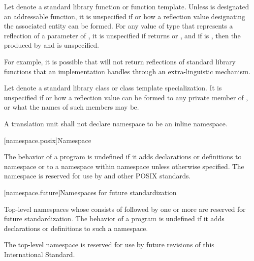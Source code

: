 \pnum
Let  denote
a standard library function or function template.
Unless  is designated an addressable function,
it is unspecified if or how
a reflection value designating the associated entity can be formed.
For any value  of type  that
represents a reflection of a parameter of ,
it is unspecified if 
returns  or , and
if  is , then
the \ntmbs{} produced by
 and
 is unspecified.
\begin{note}
For example, it is possible that 
will not return reflections of standard library functions
that an implementation handles through an extra-linguistic mechanism.
\end{note}

\pnum
Let  denote
a standard library class or class template specialization.
It is unspecified if or how
a reflection value can be formed to any private member of ,
or what the names of such members may be.

\pnum
A translation unit shall not declare namespace  to be an inline namespace.

[namespace.posix]{Namespace }

\pnum
The behavior of a \Cpp{} program is undefined if it adds declarations or definitions to namespace
or to a namespace within namespace
unless otherwise specified. The namespace  is reserved for use by
\IsoPosixUndated{} and other POSIX standards.

[namespace.future]{Namespaces for future standardization}

\pnum
Top-level namespaces whose  consists of 
followed by one or more 
are reserved for future standardization.
The behavior of a \Cpp{} program is undefined if
it adds declarations or definitions to such a namespace.
\begin{example}
The top-level namespace  is reserved
for use by future revisions of this International Standard.
\end{example}

